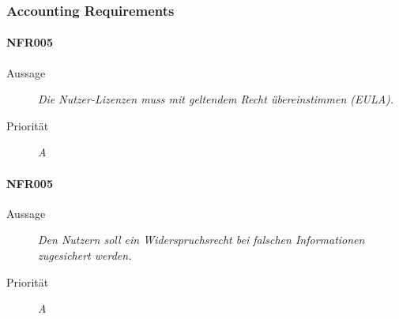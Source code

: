 \subsubsection{Accounting Requirements}

\paragraph{NFR005}
\begin{description}
     \item[Aussage]
        \textit{Die Nutzer-Lizenzen muss mit geltendem Recht \"ubereinstimmen (EULA).}
    \item [Priorit\"at] \textit{A}
\end{description}

\paragraph{NFR005}
\begin{description}
     \item[Aussage]
        \textit{Den Nutzern soll ein Widerspruchsrecht bei falschen Informationen zugesichert werden.}
    \item [Priorit\"at] \textit{A}
\end{description}